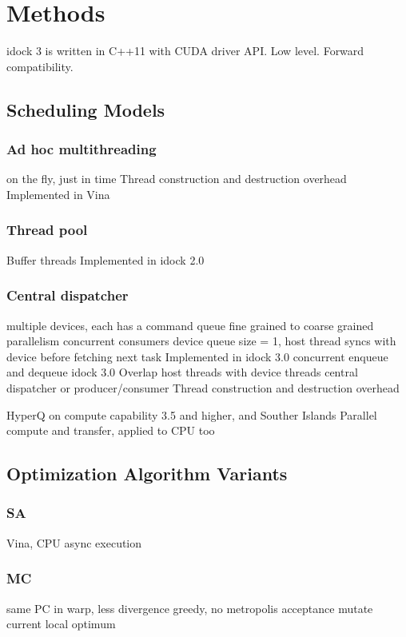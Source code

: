 \documentclass[10pt, conference, compsocconf]{../IEEEtran}
\begin{document}

\section{Methods}

idock 3 is written in C++11 with CUDA driver API. Low level. Forward compatibility.

\subsection{Scheduling Models}

\subsubsection{Ad hoc multithreading}
on the fly, just in time
Thread construction and destruction overhead
Implemented in Vina

\subsubsection{Thread pool}
Buffer threads
Implemented in idock 2.0

\subsubsection{Central dispatcher}
multiple devices, each has a command queue
fine grained to coarse grained parallelism
concurrent consumers
device queue size = 1, host thread syncs with device before fetching next task
Implemented in idock 3.0
concurrent enqueue and dequeue
idock 3.0
Overlap host threads with device threads
central dispatcher or producer/consumer
Thread construction and destruction overhead

HyperQ on compute capability 3.5 and higher, and Souther Islands
Parallel compute and transfer, applied to CPU too

\subsection{Optimization Algorithm Variants}

\subsubsection{SA}
Vina, CPU async execution

\subsubsection{MC}
same PC in warp, less divergence
greedy, no metropolis acceptance
mutate current local optimum
\end{document}
